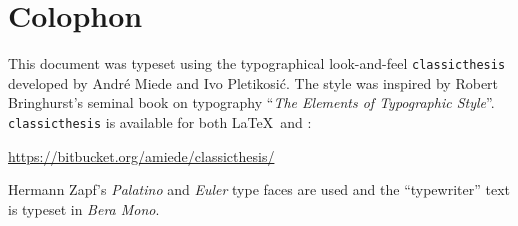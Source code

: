 \pagestyle{empty}

\hfill

\vfill

\section*{Colophon}
This document was typeset using the typographical look-and-feel \texttt{classicthesis} developed by Andr\'e Miede and Ivo Pletikosić.
The style was inspired by Robert Bringhurst's seminal book on typography ``\emph{The Elements of Typographic Style}''.
\texttt{classicthesis} is available for both \LaTeX\ and \mLyX:
\begin{center}
    \url{https://bitbucket.org/amiede/classicthesis/}
\end{center}

\bigskip

\noindent\finalVersionString

Hermann Zapf's \emph{Palatino} and \emph{Euler} type faces are used and the ``typewriter'' text is typeset in \emph{Bera Mono}.
